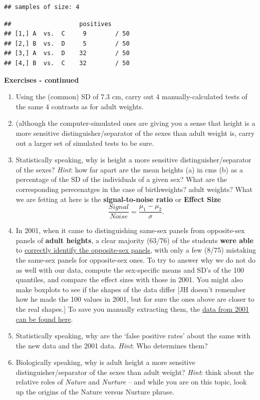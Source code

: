 \documentclass[]{book}
\begin{document}
\begin{verbatim}
## samples of size: 4
\end{verbatim}

\begin{verbatim}
##                   positives     
## [1,] A  vs.  C     9        / 50
## [2,] B  vs.  D     5        / 50
## [3,] A  vs.  D    32        / 50
## [4,] B  vs.  C    32        / 50
\end{verbatim}

\textbf{Exercises - continued}

\begin{enumerate}
\def\labelenumi{\arabic{enumi}.}
\setcounter{enumi}{7}
\item
  Using the (common) SD of 7.3 cm, carry out 4 manually-calculated tests of the same 4 contrasts as for adult weights.
\item
  (although the computer-simulated ones are giving you a sense that height is a more sensitive distinguisher/separator of the sexes than adult weight is, carry out a larger set of simulated tests to be sure.
\item
  Statistically speaking, why is height a more sensitive distinguisher/separator of the sexes? \emph{Hint}: how far apart are the mean heights (a) in cms (b) as a percentage of the SD of the individuals of a given sex? What are the corresponding perecenatges in the case of birthweights? adult weights? What we are fetting at here is the \textbf{signal-to-noise ratio} or \textbf{Effect Size}
  \[ \frac{Signal}{Noise} = \frac{\mu_1 - \mu_2}{\sigma}.\]
\item
  In 2001, when it came to distinguishing same-sex panels from opposite-sex panels of \textbf{adult heights}, a clear majority (63/76) of the students \textbf{were able} to \href{http://www.medicine.mcgill.ca/epidemiology/hanley/c607/ch06/telling_sexes_apart.pdf\#page=2}{correctly identify the opposite-sex panels}, with only a few (8/75) mistaking the same-sex panels for opposite-sex ones. To try to answer why we do not do as well with our data, compute the sex-specific means and SD's of the 100 quantiles, and compare the effect sizes with those in 2001. You might also make boxplots to see if the shapes of the data differ {[}JH doesn't remember how he made the 100 values in 2001, but for sure the ones above are closer to the real shapes.{]} To save you manually extracting them, the \href{http://www.biostat.mcgill.ca/hanley/statbook/BirthweightsAdultHeights2001class.txt}{data from 2001 can be found here}.
\item
  Statistically speaking, why are the `false positive rates' about the same with the new data and the 2001 data. \emph{Hint}: Who determines them?
\item
  Biologically speaking, why is adult height a more sensitive distinguisher/separator of the sexes than adult weight? \emph{Hint}: think about the relative roles of \emph{Nature} and \emph{Nurture} -- and while you are on this topic, look up the origins of the Nature versus Nurture phrase.
\end{enumerate}
\end{document}
